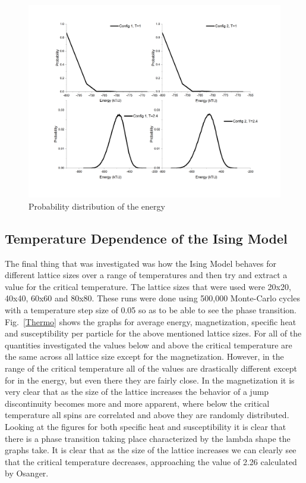 \documentclass[12pt,righttag]{article}
\begin{document}
			\begin{figure}
				
				\includegraphics[width=6in]{Graph06.png}
				
				
				
				\caption{\label{Probability} Probability distribution of the energy}
			\end{figure}
		
		
\subsection{Temperature Dependence of the Ising Model}		
		
		The final thing that was investigated was how the Ising Model behaves for different lattice sizes over a range of temperatures and then try and extract a value for the critical temperature. The lattice sizes that were used were 20x20, 40x40, 60x60 and 80x80. These runs were done using 500,000 Monte-Carlo cycles with a temperature step size of 0.05 so as to be able to see the phase transition. Fig.~\ref{Thermo} shows  the graphs for average energy, magnetization, specific heat and susceptibility per particle for the above mentioned lattice sizes. For all of the quantities investigated the values below and above the critical temperature are the same across all lattice size except for the magnetization. However, in the range of the critical temperature all of the values are drastically different except for in the energy, but even there they are fairly close. In the magnetization it is very clear that as the size of the lattice increases the behavior of a jump discontinuity becomes more and more apparent, where below the critical temperature all spins are correlated and above they are randomly distributed. Looking at the figures for both specific heat and susceptibility it is clear that there is a phase transition taking place characterized by the lambda shape the graphs take. It is clear that as the size of the lattice increases we can clearly see that the critical temperature decreases, approaching the value of 2.26 calculated by Osanger.
		
\end{document}
